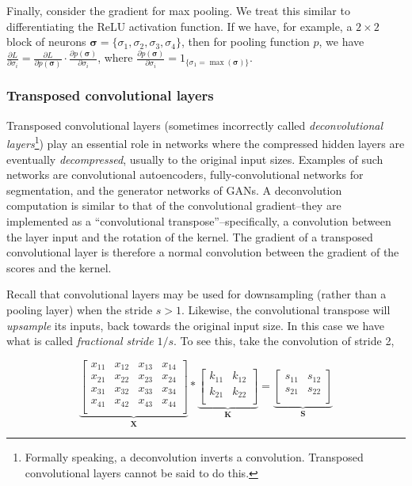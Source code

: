 Finally, consider the gradient for max pooling. We treat this similar to differentiating the ReLU activation function. If we have, for example, a $2 \times 2$ block of neurons $\boldsymbol\sigma=\{\sigma_1, \sigma_2, \sigma_3, \sigma_4\}$, then for pooling function $p$, we have $\frac{\partial{L}}{\partial{\sigma_i}} = \frac{\partial{L}}{\partial{p(\boldsymbol\sigma)}}\cdot\frac{\partial{p(\boldsymbol\sigma)}}{\partial{\sigma_i}}$, where $\frac{\partial{p(\boldsymbol\sigma)}}{\partial{\sigma_i}} = 1_{\{\sigma_1 = \max(\boldsymbol\sigma)\}}$.

\subsubsection{Transposed convolutional layers}

Transposed convolutional layers (sometimes incorrectly called \emph{deconvolutional layers}\footnote{Formally speaking, a deconvolution inverts a convolution. Transposed convolutional layers cannot be said to do this.}) play an essential role in networks where the compressed hidden layers are eventually \emph{decompressed}, usually to the original input sizes. Examples of such networks are convolutional autoencoders, fully-convolutional networks for segmentation, and the generator networks of GANs. A deconvolution computation is similar to that of the convolutional gradient--they are implemented as a ``convolutional transpose''--specifically, a convolution between the layer input and the rotation of the kernel. The gradient of a transposed convolutional layer is therefore a normal convolution between the gradient of the scores and the kernel.

Recall that convolutional layers may be used for downsampling (rather than a pooling layer) when the stride $s > 1$. Likewise, the convolutional transpose will \emph{upsample} its inputs, back towards the original input size. In this case we have what is called \emph{fractional stride} $1/s$. To see this, take the convolution of stride 2,

$$
\underbrace{\begin{bmatrix}
x_{11} & x_{12} & x_{13} & x_{14} \\
x_{21} & x_{22} & x_{23} & x_{24} \\
x_{31} & x_{32} & x_{33} & x_{34} \\
x_{41} & x_{42} & x_{43} & x_{44} \\
\end{bmatrix}}_{\mathbf{X}} * 
\underbrace{\begin{bmatrix}
k_{11} & k_{12} \\
k_{21} & k_{22} \\
\end{bmatrix}}_{\mathbf{K}} =
\underbrace{\begin{bmatrix}
s_{11} & s_{12} \\
s_{21} & s_{22} \\
\end{bmatrix}}_{\mathbf{S}}
$$

